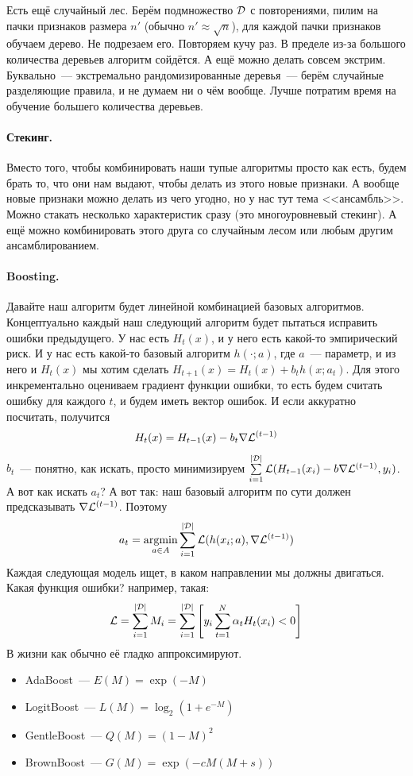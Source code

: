 \documentclass{article}
\begin{document}
    Есть ещё случайный лес. Берём подмножество ${\mathcal{D}}$ с повторениями, пилим на пачки признаков размера $n'$ (обычно $n'\approx\sqrt n$), для каждой пачки признаков обучаем дерево. Не подрезаем его. Повторяем кучу раз. В пределе из-за большого количества деревьев алгоритм сойдётся. А ещё можно делать совсем экстрим. Буквально~--- экстремально рандомизированные деревья~--- берём случайные разделяющие правила, и не думаем ни о чём вообще. Лучше потратим время на обучение большего количества деревьев.
    \paragraph{Стекинг.}
    Вместо того, чтобы комбинировать наши тупые алгоритмы просто как есть, будем брать то, что они нам выдают, чтобы делать из этого новые признаки. А вообще новые признаки можно делать из чего угодно, но у нас тут тема <<ансамбль>>. Можно стакать несколько характеристик сразу (это многоуровневый стекинг). А ещё можно комбинировать этого друга со случайным лесом или любым другим ансамблированием.
    \paragraph{Boosting.}
    Давайте наш алгоритм будет линейной комбинацией базовых алгоритмов. Концептуально каждый наш следующий алгоритм будет пытаться исправить ошибки предыдущего. У нас есть $H_t(x)$, и у него есть какой-то эмпирический риск. И у нас есть какой-то базовый алгоритм $h(\cdot;a)$, где $a$~--- параметр, и из него и $H_t(x)$ мы хотим сделать $H_{t+1}(x)=H_t(x)+b_th(x;a_t)$. Для этого инкрементально оцениваем градиент функции ошибки, то есть будем считать ошибку для каждого $t$, и будем иметь вектор ошибок. И если аккуратно посчитать, получится
    \[
    H_t(x)=H_{t-1}(x)-b_t\nabla{\mathcal{L}}^{(t-1)}
    \]
    $b_t$~--- понятно, как искать, просто минимизируем $\sum\limits_{i=1}^{|{\mathcal{D}}|}{\mathcal{L}}(H_{t-1}(x_i)-b\nabla{\mathcal{L}}^{(t-1)},y_i)$. А вот как искать $a_t$? А вот так: наш базовый алгоритм по сути должен предсказывать $\nabla{\mathcal{L}}^{(t-1)}$. Поэтому
    \[
    a_t=\operatorname*{argmin}_{a\in A}\sum\limits_{i=1}^{|{\mathcal{D}}|}{\mathcal{L}}(h(x_i;a),\nabla{\mathcal{L}}^{(t-1)})
    \]
    Каждая следующая модель ищет, в каком направлении мы должны двигаться.\\
    Какая функция ошибки? например, такая:
    \[
    {\mathcal{L}}=\sum\limits_{i=1}^{|{\mathcal{D}}|}M_i=\sum\limits_{i=1}^{|{\mathcal{D}}|}\left[y_i\sum\limits_{t=1}^N\alpha_tH_t(x_i)<0\right]
    \]
    В жизни как обычно её гладко аппроксимируют.
    \begin{itemize}
        \item AdaBoost~--- $E(M)=\exp(-M)$
        \item LogitBoost~--- $L(M)=\log_2\left(1+e^{-M}\right)$
        \item GentleBoost~--- $Q(M)=(1-M)^2$
        \item BrownBoost~--- $G(M)=\exp(-cM(M+s))$
    \end{itemize}
\end{document}
